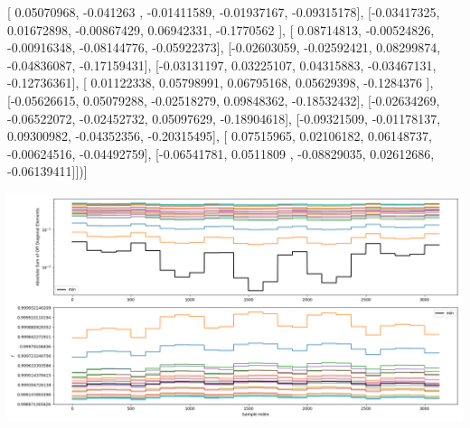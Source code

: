 \documentclass{article}
\begin{document}
       [ 0.05070968, -0.041263  , -0.01411589, -0.01937167, -0.09315178],
       [-0.03417325,  0.01672898, -0.00867429,  0.06942331, -0.1770562 ],
       [ 0.08714813, -0.00524826, -0.00916348, -0.08144776, -0.05922373],
       [-0.02603059, -0.02592421,  0.08299874, -0.04836087, -0.17159431],
       [-0.03131197,  0.03225107,  0.04315883, -0.03467131, -0.12736361],
       [ 0.01122338,  0.05798991,  0.06795168,  0.05629398, -0.1284376 ],
       [-0.05626615,  0.05079288, -0.02518279,  0.09848362, -0.18532432],
       [-0.02634269, -0.06522072, -0.02452732,  0.05097629, -0.18904618],
       [-0.09321509, -0.01178137,  0.09300982, -0.04352356, -0.20315495],
       [ 0.07515965,  0.02106182,  0.06148737, -0.00624516, -0.04492759],
       [-0.06541781,  0.0511809 , -0.08829035,  0.02612686, -0.06139411]])]
\begin{center}
\includegraphics[scale=.9]{report_pickled_controls251/control_dpn_all.png}

\end{center}
\end{document}
